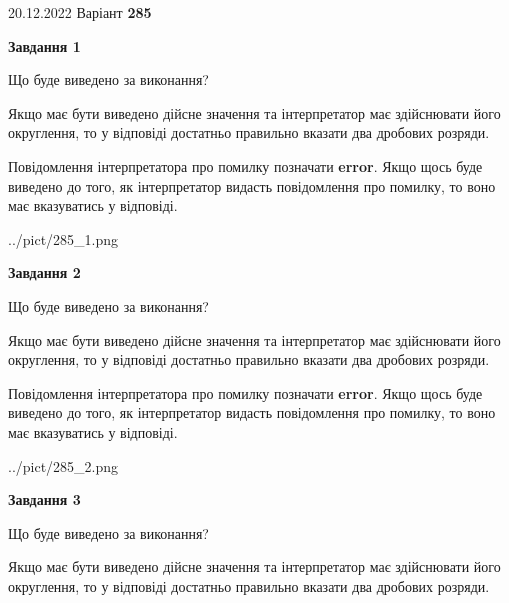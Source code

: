 \documentclass[12pt, ukrainian]{article}
\begin{document}
{20.12.2022 Варіант \No \textbf { 285 }\par}
{
\begin {Large}

{\begin {center}\textbf{Завдання 1}\end {center}}\par
Що буде виведено за виконання? \par

Якщо має бути виведено дійсне значення та інтерпретатор має здійснювати його округлення, 
то у відповіді достатньо правильно вказати два дробових розряди.

Повідомлення інтерпретатора про помилку позначати \textbf{error}.
Якщо щось буде виведено до того, як інтерпретатор видасть повідомлення про помилку, 
то воно має вказуватись у відповіді. \par

\begin{center}
	{../pict/285_1.png}
\end{center}
\newpage

{\begin {center}\textbf{Завдання 2}\end {center}}\par
Що буде виведено за виконання? \par

Якщо має бути виведено дійсне значення та інтерпретатор має здійснювати його округлення, 
то у відповіді достатньо правильно вказати два дробових розряди.

Повідомлення інтерпретатора про помилку позначати \textbf{error}.
Якщо щось буде виведено до того, як інтерпретатор видасть повідомлення про помилку, 
то воно має вказуватись у відповіді. \par

\begin{center}
	{../pict/285_2.png}
\end{center}
\newpage

{\begin {center}\textbf{Завдання 3}\end {center}}\par
Що буде виведено за виконання? \par

Якщо має бути виведено дійсне значення та інтерпретатор має здійснювати його округлення, 
то у відповіді достатньо правильно вказати два дробових розряди.


\end{Large}}
\end{document}
